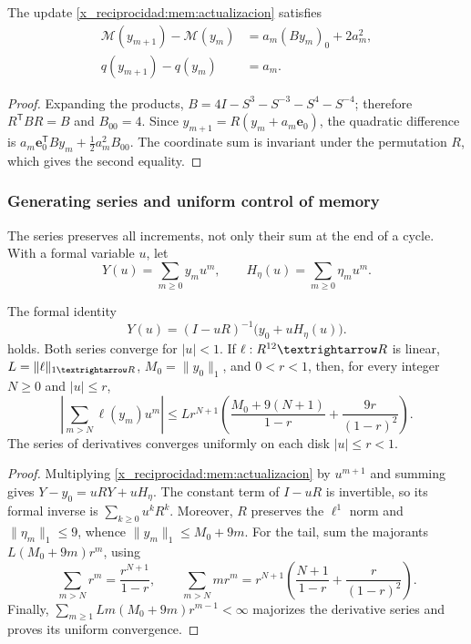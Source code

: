 \begin{proposition}
\label{x_reciprocidad:mem:prop-balance}
The update \eqref{x_reciprocidad:mem:actualizacion} satisfies
\begin{equation}
 \begin{aligned}
 \mathcal M(y_{m+1})-\mathcal M(y_m)
   &=a_m(By_m)_0+2a_m^2,\\
 q(y_{m+1})-q(y_m)&=a_m.
 \end{aligned}
 \label{x_reciprocidad:mem:balance}
\end{equation}
\end{proposition}
\begin{proof}
Expanding the products,
\(B=4I-S^3-S^{-3}-S^4-S^{-4}\); therefore
\(R^{\mathsf T}BR=B\) and \(B_{00}=4\).
Since \(y_{m+1}=R(y_m+a_m\mathbf e_0)\), the quadratic difference
is \(a_m\mathbf e_0^{\mathsf T}By_m+\tfrac12a_m^2B_{00}\).
The coordinate sum is invariant under the permutation \(R\),
which gives the second equality.
\end{proof}

\subsubsection{Generating series and uniform control of memory}

The series preserves all increments, not only their sum at the end of
a cycle. With a formal variable \(u\), let
\[
 Y(u)=\sum_{m\geq0}y_mu^m,\qquad
 H_\eta(u)=\sum_{m\geq0}\eta_mu^m.
\]

\begin{proposition}
\label{x_reciprocidad:mem:prop-serie}
The formal identity
\begin{equation}
 Y(u)=(I-uR)^{-1}\bigl(y_0+uH_\eta(u)\bigr).
 \label{x_reciprocidad:mem:serie}
\end{equation}
holds. Both series converge for \(|u|<1\). If \(\ell:\RR^{12}\to\RR\)
is linear, \(L=\|\ell\|_{1\to\RR}\), \(M_0=\|y_0\|_1\), and
\(0<r<1\), then, for every integer \(N\geq0\) and \(|u|\leq r\),
\begin{equation}
 \left|\sum_{m>N}\ell(y_m)u^m\right|
 \leq Lr^{N+1}\left(
 \frac{M_0+9(N+1)}{1-r}+\frac{9r}{(1-r)^2}\right).
 \label{x_reciprocidad:mem:cota}
\end{equation}
The series of derivatives converges uniformly on each disk
\(|u|\leq r<1\).
\end{proposition}
\begin{proof}
Multiplying \eqref{x_reciprocidad:mem:actualizacion} by \(u^{m+1}\) and summing gives
\(Y-y_0=uRY+uH_\eta\). The constant term of \(I-uR\) is
invertible, so its formal inverse is \(\sum_{k\geq0}u^kR^k\).
Moreover, \(R\) preserves the \(\ell^1\) norm and
\(\|\eta_m\|_1\leq9\), whence
\(\|y_m\|_1\leq M_0+9m\).
For the tail, sum the majorants
\(L(M_0+9m)r^m\), using
\[
 \sum_{m>N}r^m=\frac{r^{N+1}}{1-r},\qquad
 \sum_{m>N}mr^m=r^{N+1}
 \left(\frac{N+1}{1-r}+\frac r{(1-r)^2}\right).
\]
Finally, \(\sum_{m\geq1}Lm(M_0+9m)r^{m-1}<\infty\)
majorizes the derivative series and proves its uniform convergence.
\end{proof}


